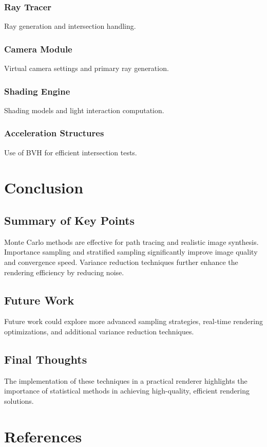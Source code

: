 \documentclass[12pt]{article}
\begin{document}
\subsubsection{Ray Tracer}
Ray generation and intersection handling.
\subsubsection{Camera Module}
Virtual camera settings and primary ray generation.
\subsubsection{Shading Engine}
Shading models and light interaction computation.
\subsubsection{Acceleration Structures}
Use of BVH for efficient intersection tests.

\section{Conclusion}
\label{sec:conclusion}
\subsection{Summary of Key Points}
Monte Carlo methods are effective for path tracing and realistic image synthesis. Importance sampling and stratified sampling significantly improve image quality and convergence speed. Variance reduction techniques further enhance the rendering efficiency by reducing noise.
\subsection{Future Work}
Future work could explore more advanced sampling strategies, real-time rendering optimizations, and additional variance reduction techniques.
\subsection{Final Thoughts}
The implementation of these techniques in a practical renderer highlights the importance of statistical methods in achieving high-quality, efficient rendering solutions.

\section{References}
\label{sec:references}
\end{document}
